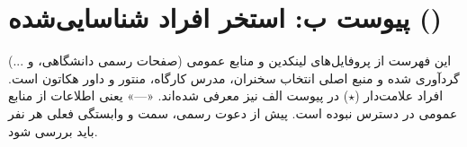 \documentclass[a4paper,12pt]{article}
\begin{document}
	
	
	
	
	
	
	

	\newpage
	\section*{پیوست ب: استخر افراد شناسایی‌شده ()}

	{\small\color{mci-gray}
		این فهرست از پروفایل‌های لینکدین و منابع عمومی (صفحات رسمی دانشگاهی،  و ...) گردآوری شده و
		منبع اصلی انتخاب سخنران، مدرس کارگاه، منتور و داور هکاتون است. افراد علامت‌دار
		(\ensuremath{\star}) در پیوست الف نیز معرفی شده‌اند. «---» یعنی اطلاعات از منابع عمومی در دسترس نبوده است.
		پیش از دعوت رسمی، سمت و وابستگی فعلی هر نفر باید بررسی شود.}
\end{document}
